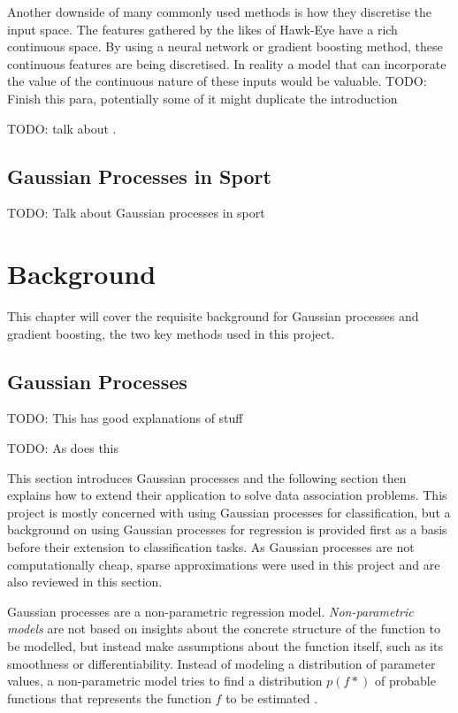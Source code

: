 \documentclass[12pt,a4paper]{report}
\theoremstyle{definition}
\begin{document}
Another downside of many commonly used methods is how they discretise the input space. 
The features gathered by the likes of Hawk-Eye have a rich continuous space.
By using a neural network or gradient boosting method, these continuous features are being discretised. 
In reality a model that can incorporate the value of the continuous nature of these inputs would be valuable.
TODO: Finish this para, potentially some of it might duplicate the introduction

 TODO: talk about \citep{Blumberg2020}.

\section{Gaussian Processes in Sport}

TODO: Talk about Gaussian processes in sport

\chapter{Background}

This chapter will cover the requisite background for Gaussian processes and gradient boosting, the two key methods used in this project.

\section{Gaussian Processes}

\citep{Yi2019} TODO: This has good explanations of stuff

\citep{Griffiths2023} TODO: As does this

This section introduces Gaussian processes and the following section then explains how to extend their application to solve data association problems. 
This project is mostly concerned with using Gaussian processes for classification, but a background on using Gaussian processes for regression is provided first as a basis before their extension to classification tasks. 
As Gaussian processes are not computationally cheap, sparse approximations were used in this project and are also reviewed in this section.

Gaussian processes are a non-parametric regression model. 
\emph{Non-parametric models} are not based on insights about the concrete structure of the function to be modelled, but instead make assumptions about the function itself, such as its smoothness or differentiability. 
Instead of modeling a distribution of parameter values, a non-parametric model tries to find a distribution $p(f*)$ of probable functions that represents the function $f$ to be estimated \citep{Kaiser2017}.
\end{document}
